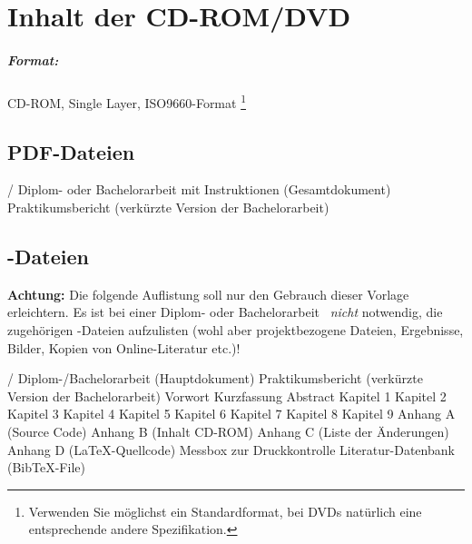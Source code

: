 \chapter{Inhalt der CD-ROM/DVD}
\label{app:cdrom}

\paragraph{Format:} 
		CD-ROM, Single Layer, ISO9660-Format%
\footnote{Verwenden Sie möglichst ein Standardformat, bei DVDs natürlich
eine entsprechende andere Spezifikation.}


\section{PDF-Dateien}
\begin{FileList}{/}
 Diplom- oder Bachelorarbeit mit Instruktionen (Gesamtdokument)
 Praktikumsbericht (verkürzte Version der Bachelorarbeit) %
\end{FileList}


\section{\latex-Dateien}

\textbf{Achtung:} Die folgende Auflistung soll nur den Gebrauch dieser Vorlage erleichtern. Es ist bei einer Diplom- oder Bachelorarbeit \ia\ \emph{nicht} notwendig, die zugehörigen \latex-Dateien aufzulisten (wohl aber projektbezogene Dateien, Ergebnisse, Bilder, Kopien von Online-Literatur etc.)!

\begin{FileList}{/}
 Diplom-/Bachelorarbeit (Hauptdokument) %
 Praktikumsbericht (verkürzte Version der Bachelorarbeit) %
 Vorwort %
 Kurzfassung %
 Abstract %
 Kapitel 1 %
 Kapitel 2 %
 Kapitel 3
 Kapitel 4 %
 Kapitel 5 %
 Kapitel 6 %
 Kapitel 7 %
 Kapitel 8 %
 Kapitel 9 %
 Anhang A (Source Code) %
 Anhang B (Inhalt CD-ROM) %
 Anhang C (Liste der Änderungen) %
 Anhang D (LaTeX-Quellcode) %
 Messbox zur Druckkontrolle %
 Literatur-Datenbank (BibTeX-File)
\end{FileList}

